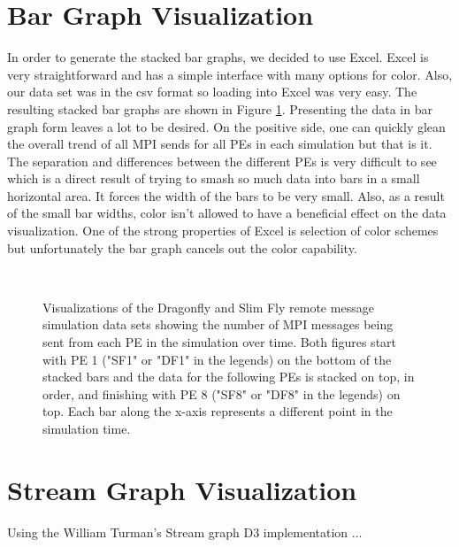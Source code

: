 \documentclass[12pt]{article}
\begin{document}
\section{Bar Graph Visualization} \label{bar}
In order to generate the stacked bar graphs, we decided to use Excel. Excel is very straightforward and has a simple interface with many options for color. Also, our data set was in the csv format so loading into Excel was very easy. The resulting stacked bar graphs are shown in Figure \ref{Bar}. Presenting the data in bar graph form leaves a lot to be desired. On the positive side, one can quickly glean the overall trend of all MPI sends for all PEs in each simulation but that is it. The separation and differences between the different PEs is very difficult to see which is a direct result of trying to smash so much data into bars in a small horizontal area. It forces the width of the bars to be very small. Also, as a result of the small bar widths, color isn't allowed to have a beneficial effect on the data visualization. One of the strong properties of Excel is selection of color schemes but unfortunately the bar graph cancels out the color capability.
\begin{figure}[!ht]
     \centering
     \\
     \caption{Visualizations of the Dragonfly and Slim Fly remote message simulation data sets showing the number of MPI messages being sent from each PE in the simulation over time. Both figures start with PE 1 ("SF1" or "DF1" in the legends) on the bottom of the stacked bars and the data for the following PEs is stacked on top, in order, and finishing with PE 8 ("SF8" or "DF8" in the legends) on top. Each bar along the x-axis represents a different point in the simulation time.}
     \label{Bar}
\end{figure}

\section{Stream Graph Visualization} \label{stream}
Using the William Turman's Stream graph D3 implementation \cite{Stream}...


%
\end{document}
